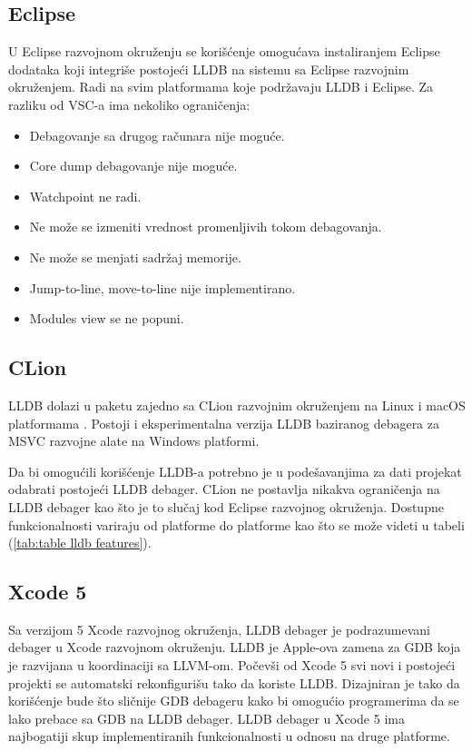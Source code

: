 \documentclass[a4paper]{article}
\begin{document}
\subsection*{Eclipse}
U Eclipse razvojnom okruženju se korišćenje omogućava instaliranjem Eclipse dodataka \cite{eclipse_plugin} koji integriše postojeći LLDB na sistemu sa Eclipse razvojnim okruženjem. Radi na svim platformama koje podržavaju LLDB i Eclipse. Za razliku od VSC-a ima nekoliko ograničenja:

\begin{itemize}
\item Debagovanje sa drugog računara nije moguće.
\item Core dump debagovanje nije moguće.
\item Watchpoint ne radi.
\item Ne može se izmeniti vrednost promenljivih tokom debagovanja.
\item Ne može se menjati sadržaj memorije.
\item Jump-to-line, move-to-line nije implementirano.
\item Modules view se ne popuni.
\end{itemize}

\subsection*{CLion}
LLDB dolazi u paketu zajedno sa CLion razvojnim okruženjem na Linux i macOS platformama \cite{clion_lldb}. Postoji i eksperimentalna verzija LLDB baziranog debagera za MSVC razvojne alate na Windows platformi.

Da bi omogućili korišćenje LLDB-a potrebno je u podešavanjima za dati projekat odabrati postojeći LLDB debager.  CLion ne postavlja nikakva ograničenja na LLDB debager kao što je to slučaj kod Eclipse razvojnog okruženja.  Dostupne funkcionalnosti variraju od platforme do platforme kao što se može videti u tabeli (\ref{tab:table lldb features}).

\subsection*{Xcode 5}
Sa verzijom 5 Xcode razvojnog okruženja, LLDB debager je podrazumevani debager u Xcode razvojnom okruženju. LLDB je Apple-ova zamena za GDB koja je razvijana u koordinaciji sa LLVM-om. Počevši od Xcode 5 svi novi i postojeći projekti se automatski rekonfigurišu tako da koriste LLDB. Dizajniran je tako da korišćenje bude što sličnije GDB debageru kako bi omogućio programerima da se lako prebace sa GDB na LLDB debager. LLDB debager u Xcode 5 ima najbogatiji skup implementiranih funkcionalnosti u odnosu na druge platforme.
\end{document}
